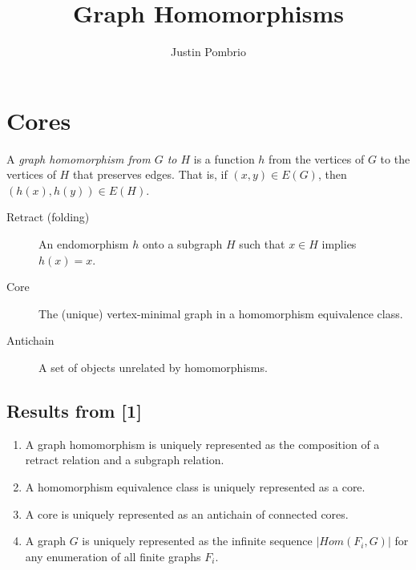 \documentclass{article}
\begin{document}
\title{Graph Homomorphisms}
\author{Justin Pombrio}
\maketitle

\section{Cores}

A \emph{graph homomorphism from $G$ to $H$} is a function $h$ from the
vertices of $G$ to the vertices of $H$ that preserves edges.  That is,
if $(x, y) \in E(G)$, then $(h(x), h(y)) \in E(H)$.

\begin{description}
\item[Retract (folding)] An endomorphism $h$ onto a subgraph $H$ such that $x
  \in H$ implies $h(x) = x$.
\item[Core] The (unique) vertex-minimal graph in a homomorphism
  equivalence class.
\item[Antichain] A set of objects unrelated by homomorphisms.
\end{description}

\subsection{Results from [1]}
\begin{enumerate}
\item A graph homomorphism is uniquely represented as the composition
  of a retract relation and a subgraph relation.
\item A homomorphism equivalence class is uniquely represented as a
  core.
\item A core is uniquely represented as an antichain of connected
  cores.
\item A graph $G$ is uniquely represented as the infinite sequence
  $|Hom(F_i, G)|$ for any enumeration of all finite graphs $F_i$.
\end{enumerate}
\end{document}
